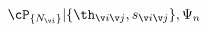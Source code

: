 \begin{equation}
\label{waveF}
 \cP_{\{N_{\v i}\}} |\{\th_{\v i\v j}, s_{\v i\v j} \},\Psi_n\>
\end{equation}

